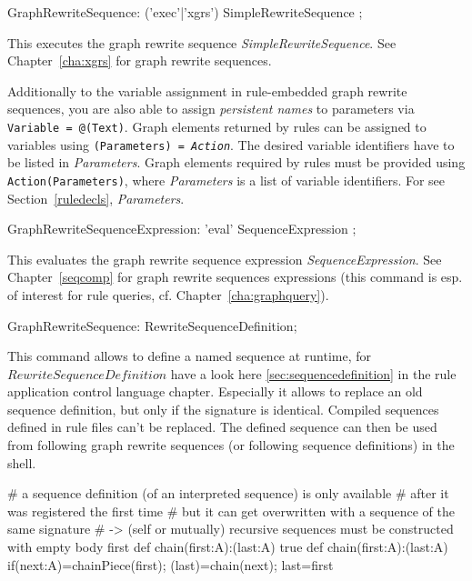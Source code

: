 \begin{rail}
  GraphRewriteSequence: ('exec'|'xgrs') SimpleRewriteSequence ;
\end{rail}
This executes the graph rewrite sequence \emph{SimpleRewriteSequence}.
See Chapter~\ref{cha:xgrs} for graph rewrite sequences.

Additionally to the variable assignment in rule-embedded graph rewrite sequences, you are also able to assign \emph{persistent names} to parameters via  \texttt{Variable = @(Text)}.
Graph elements returned by rules can be assigned to variables using \texttt{(Para\-meters) = \emph{Action}}.
The desired variable identifiers have to be listed in \emph{Parameters}.
Graph elements required by rules must be provided using \texttt{Action(Para\-meters)}, where \emph{Parameters} is a list of variable identifiers.
For  see Section~\ref{ruledecls}, \emph{Parameters}.

\begin{rail}
  GraphRewriteSequenceExpression: 'eval' SequenceExpression ;
\end{rail}
This evaluates the graph rewrite sequence expression \emph{SequenceExpression}.
See Chapter~\ref{seqcomp} for graph rewrite sequences expressions (this command is esp. of interest for rule queries, cf. Chapter~\ref{cha:graphquery}).

\begin{rail}
  GraphRewriteSequence: RewriteSequenceDefinition;
\end{rail}
This command allows to define a named sequence at runtime, for $RewriteSequenceDefinition$ have a look here  \ref{sec:sequencedefinition} in the rule application control language chapter.
Especially it allows to replace an old sequence definition, but only if the signature is identical.
Compiled sequences defined in rule files can't be replaced.
The defined sequence can then be used from following graph rewrite sequences (or following sequence definitions) in the shell.

\begin{example}
\begin{grgen}
# a sequence definition (of an interpreted sequence) is only available
# after it was registered the first time
# but it can get overwritten with a sequence of the same signature
# -> (self or mutually) recursive sequences must be constructed with empty body first
def chain(first:A):(last:A){ true }
def chain(first:A):(last:A){ if{(next:A)=chainPiece(first); (last)=chain(next); last=first} }
\end{grgen}
\end{example}

